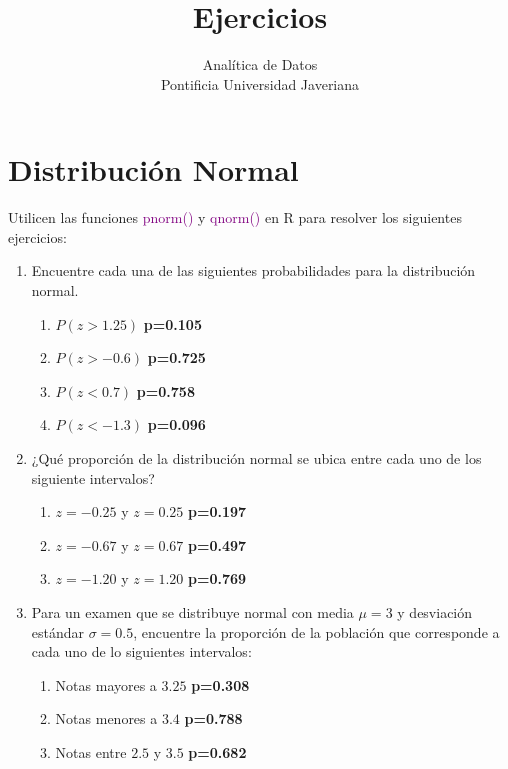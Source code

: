 \documentclass[letterpaper]{article}
\begin{document}
\title{{\bf Ejercicios}} 
\author{Analítica de Datos  \\
	Pontificia Universidad Javeriana}

\date{}

\maketitle


\section{Distribución Normal}

Utilicen las funciones \textcolor{purple}{pnorm()} y \textcolor{purple}{qnorm()} en R para resolver los siguientes ejercicios:


\begin{enumerate}
	\item Encuentre cada una de las siguientes probabilidades para la distribución normal.
	\begin{enumerate}
		\item $P(z>1.25)$ {\bf p=0.105}
		\item $P(z>-0.6)$ {\bf p=0.725}
		\item $P(z<0.7)$ {\bf p=0.758}
		\item $P(z<-1.3)$ {\bf p=0.096}
	\end{enumerate}
	
	\item ¿Qué proporción de la distribución normal se ubica entre cada uno de los siguiente intervalos?
	\begin{enumerate}
		\item $z= -0.25$ y $z=0.25$  {\bf p=0.197}
		\item $z=-0.67$ y $z=0.67$  {\bf p=0.497}
		\item $z= -1.20$ y $z=1.20$  {\bf p=0.769}
	\end{enumerate}
	
	\item Para un examen que se distribuye normal con media $\mu=3$ y desviación estándar $\sigma=0.5$, encuentre la proporción de la población que corresponde a cada uno de lo siguientes intervalos:
	\begin{enumerate}
		\item Notas mayores a $3.25$ {\bf p=0.308}
		\item Notas menores a $3.4$ {\bf p=0.788}
		\item Notas entre $2.5$ y $3.5$ {\bf p=0.682}
	\end{enumerate}
	

\end{enumerate}
\end{document}
